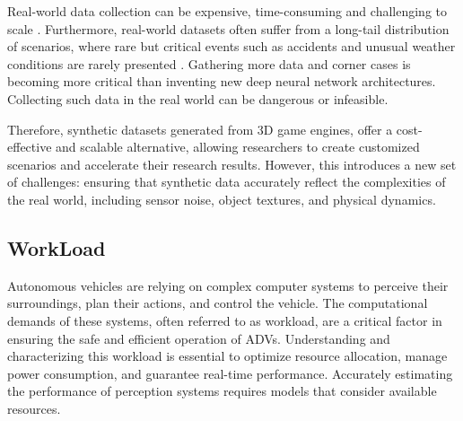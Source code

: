 

Real-world data collection can be expensive, time-consuming and challenging to scale \cite{feng2020}. Furthermore, real-world datasets often suffer from a long-tail distribution of scenarios, where rare but critical events such as accidents and unusual weather conditions are rarely presented \cite{song2024}. Gathering more data and corner cases is becoming more critical than inventing new deep neural network architectures. Collecting such data in the real world can be dangerous or infeasible. 

Therefore, synthetic datasets generated from 3D game engines, offer a cost-effective and scalable alternative, allowing researchers to create customized scenarios and accelerate their research results. However, this introduces a new set of challenges: ensuring that synthetic data accurately reflect the complexities of the real world, including sensor noise, object textures, and physical dynamics.


\subsection{WorkLoad}
Autonomous vehicles are relying on complex computer systems to perceive their surroundings, plan their actions, and control the vehicle. The computational demands of these systems, often referred to as workload, are a critical factor in ensuring the safe and efficient operation of ADVs. Understanding and characterizing this workload is essential to optimize resource allocation, manage power consumption, and guarantee real-time performance. Accurately estimating the performance of perception systems requires models that consider available resources. 


